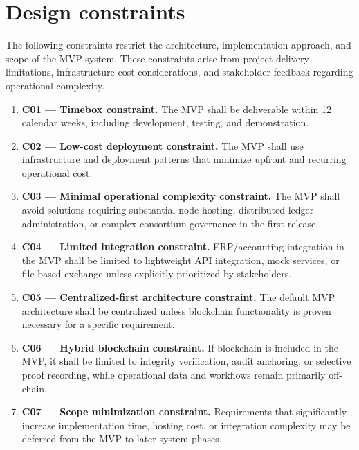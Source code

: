\documentclass[11pt,a4paper]{article}
\begin{document}
\section{Design constraints}
\label{sec:design_constraints}

The following constraints restrict the architecture, implementation approach, and scope of the MVP system. These constraints arise from project delivery limitations, infrastructure cost considerations, and stakeholder feedback regarding operational complexity.

\begin{enumerate}[label=C\arabic*:,leftmargin=*]
\item \textbf{C01 — Timebox constraint.} The MVP shall be deliverable within 12 calendar weeks, including development, testing, and demonstration.

\item \textbf{C02 — Low-cost deployment constraint.} The MVP shall use infrastructure and deployment patterns that minimize upfront and recurring operational cost.

\item \textbf{C03 — Minimal operational complexity constraint.} The MVP shall avoid solutions requiring substantial node hosting, distributed ledger administration, or complex consortium governance in the first release.

\item \textbf{C04 — Limited integration constraint.} ERP/accounting integration in the MVP shall be limited to lightweight API integration, mock services, or file-based exchange unless explicitly prioritized by stakeholders.

\item \textbf{C05 — Centralized-first architecture constraint.} The default MVP architecture shall be centralized unless blockchain functionality is proven necessary for a specific requirement.

\item \textbf{C06 — Hybrid blockchain constraint.} If blockchain is included in the MVP, it shall be limited to integrity verification, audit anchoring, or selective proof recording, while operational data and workflows remain primarily off-chain.

\item \textbf{C07 — Scope minimization constraint.} Requirements that significantly increase implementation time, hosting cost, or integration complexity may be deferred from the MVP to later system phases.
\end{enumerate}
\end{document}
